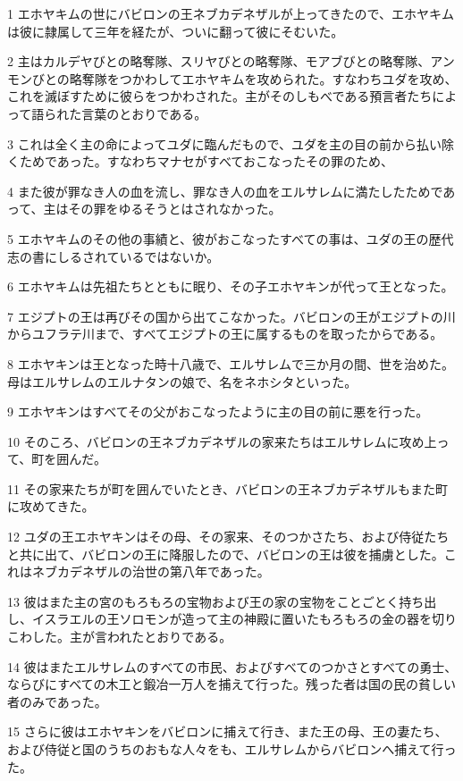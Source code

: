 \par 1 エホヤキムの世にバビロンの王ネブカデネザルが上ってきたので、エホヤキムは彼に隷属して三年を経たが、ついに翻って彼にそむいた。
\par 2 主はカルデヤびとの略奪隊、スリヤびとの略奪隊、モアブびとの略奪隊、アンモンびとの略奪隊をつかわしてエホヤキムを攻められた。すなわちユダを攻め、これを滅ぼすために彼らをつかわされた。主がそのしもべである預言者たちによって語られた言葉のとおりである。
\par 3 これは全く主の命によってユダに臨んだもので、ユダを主の目の前から払い除くためであった。すなわちマナセがすべておこなったその罪のため、
\par 4 また彼が罪なき人の血を流し、罪なき人の血をエルサレムに満たしたためであって、主はその罪をゆるそうとはされなかった。
\par 5 エホヤキムのその他の事績と、彼がおこなったすべての事は、ユダの王の歴代志の書にしるされているではないか。
\par 6 エホヤキムは先祖たちとともに眠り、その子エホヤキンが代って王となった。
\par 7 エジプトの王は再びその国から出てこなかった。バビロンの王がエジプトの川からユフラテ川まで、すべてエジプトの王に属するものを取ったからである。
\par 8 エホヤキンは王となった時十八歳で、エルサレムで三か月の間、世を治めた。母はエルサレムのエルナタンの娘で、名をネホシタといった。
\par 9 エホヤキンはすべてその父がおこなったように主の目の前に悪を行った。
\par 10 そのころ、バビロンの王ネブカデネザルの家来たちはエルサレムに攻め上って、町を囲んだ。
\par 11 その家来たちが町を囲んでいたとき、バビロンの王ネブカデネザルもまた町に攻めてきた。
\par 12 ユダの王エホヤキンはその母、その家来、そのつかさたち、および侍従たちと共に出て、バビロンの王に降服したので、バビロンの王は彼を捕虜とした。これはネブカデネザルの治世の第八年であった。
\par 13 彼はまた主の宮のもろもろの宝物および王の家の宝物をことごとく持ち出し、イスラエルの王ソロモンが造って主の神殿に置いたもろもろの金の器を切りこわした。主が言われたとおりである。
\par 14 彼はまたエルサレムのすべての市民、およびすべてのつかさとすべての勇士、ならびにすべての木工と鍛冶一万人を捕えて行った。残った者は国の民の貧しい者のみであった。
\par 15 さらに彼はエホヤキンをバビロンに捕えて行き、また王の母、王の妻たち、および侍従と国のうちのおもな人々をも、エルサレムからバビロンへ捕えて行った。
